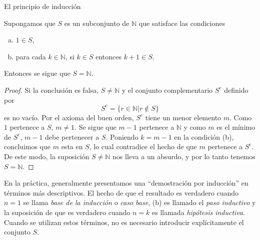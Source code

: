 \begin{section}{El principio de inducción}
\begin{teorema}\label{t1.4} Supongamos que $S$ es un subconjunto de $\mathbb N$ que satisface las condiciones 
\begin{enumerate}[a)]
\item $1 \in S$,
\item para cada $k \in \mathbb N$, si $ k \in S$ entonces $k+1\in S$.
\end{enumerate}
Entonces se sigue que $S=\mathbb N$.
\end{teorema}
\begin{proof}Si la conclusión es falsa, $S \not= \mathbb N$ y
el conjunto complementario $S^{\text{c}}$ definido por
$$
S^{\text{c}}= \{ r \in \mathbb N | r\not\in S\}
$$
 es no vacío. Por el axioma del buen orden, $S^{\text{c}}$ tiene un menor
elemento $m$. Como $1$ pertenece a $S$, $m\not=1$. Se sigue que
$m-1$ pertenece a $\mathbb N$ y como $m$ es el mínimo de
$S^{\text{c}}$, $m-1$ debe pertenecer a $S$. Poniendo $k=m-1$ en
la condición (b), concluimos que $m$ esta en $S$, lo cual
contradice el hecho de que $m$ pertenece a $S^{\text{c}}$. De este
modo, la suposición $S \not= \mathbb N$ nos lleva a un absurdo, y
por lo tanto tenemos $S= \mathbb N$.
\end{proof}

En la práctica, generalmente presentamos una ``demostración por
inducción'' en términos más descriptivos. El hecho de que el
resultado es verdadero cuando $n=1$ se llama {\it base de la
inducción} o {\it caso base}, (b) es llamado  el {\em paso inductivo} y la suposición de que es verdadero cuando $n=k$ es
llamada {\it hipótesis inductiva}. Cuando se utilizan estos
términos, no es necesario introducir explícitamente el conjunto
$S$.



\end{section}
